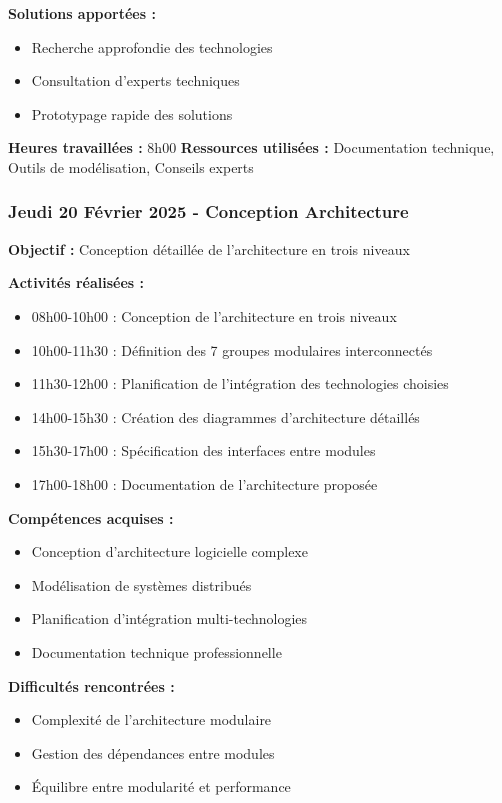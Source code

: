 \textbf{Solutions apportées :}
\begin{itemize}
    \item Recherche approfondie des technologies
    \item Consultation d'experts techniques
    \item Prototypage rapide des solutions
\end{itemize}

\textbf{Heures travaillées :} 8h00
\textbf{Ressources utilisées :} Documentation technique, Outils de modélisation, Conseils experts

\subsubsection{Jeudi 20 Février 2025 - Conception Architecture}
\textbf{Objectif :} Conception détaillée de l'architecture en trois niveaux

\textbf{Activités réalisées :}
\begin{itemize}
    \item 08h00-10h00 : Conception de l'architecture en trois niveaux
    \item 10h00-11h30 : Définition des 7 groupes modulaires interconnectés
    \item 11h30-12h00 : Planification de l'intégration des technologies choisies
    \item 14h00-15h30 : Création des diagrammes d'architecture détaillés
    \item 15h30-17h00 : Spécification des interfaces entre modules
    \item 17h00-18h00 : Documentation de l'architecture proposée
\end{itemize}

\textbf{Compétences acquises :}
\begin{itemize}
    \item Conception d'architecture logicielle complexe
    \item Modélisation de systèmes distribués
    \item Planification d'intégration multi-technologies
    \item Documentation technique professionnelle
\end{itemize}

\textbf{Difficultés rencontrées :}
\begin{itemize}
    \item Complexité de l'architecture modulaire
    \item Gestion des dépendances entre modules
    \item Équilibre entre modularité et performance
\end{itemize}

